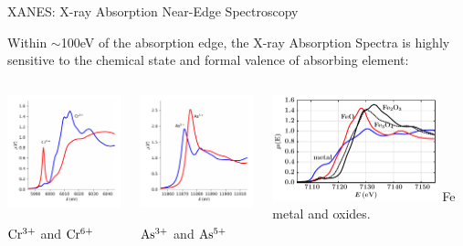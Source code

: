 
\begin{slide}{XANES:  X-ray Absorption Near-Edge Spectroscopy}
\begin{cenpage}{120mm}
 Within $\sim$100eV of the absorption edge, the X-ray Absorption Spectra is
 highly sensitive to the chemical state and formal valence of absorbing element:
\end{cenpage}

\begin{cenpage}{150mm}
  \vmm
  \begin{columns}
    \begin{column}{48mm}
      \includegraphics[width=48mm]{figs/xanes/cr}

      \vmm
      \hspace{5mm}  $\rm Cr^{3+}$ and $\rm Cr^{6+}$
    \end{column}
    \begin{column}{48mm}    
      \includegraphics[width=48mm]{figs/xanes/as}
      
      \vmm
      \hspace{5mm}    $\rm As^{3+}$ and $\rm As^{5+}$
    \end{column}

    \begin{column}{48mm}
     \includegraphics[width=48mm]{figs/xanes/fe_oxides}
      \hspace{5mm}    Fe metal and oxides.
    \end{column}
  \end{columns}


\end{cenpage}
\end{slide}
